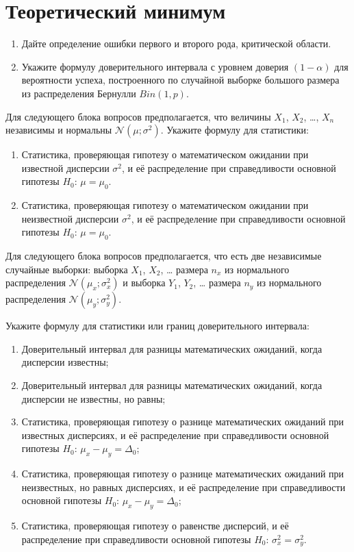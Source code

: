 \documentclass[12pt]{article}
\def \cN{\mathcal{N}}
\begin{document}
\section{Теоретический минимум}


\begin{enumerate}
  \item Дайте определение ошибки первого и второго рода, критической области.
  \item Укажите формулу доверительного интервала с уровнем доверия $(1-\alpha)$ для вероятности успеха, построенного по случайной выборке большого размера из распределения Бернулли $Bin(1, p)$.  
\end{enumerate}

Для следующего блока вопросов предполагается, что величины $X_1$, $X_2$, \ldots, $X_n$ независимы и нормальны $\cN(\mu;\sigma^2)$.
Укажите формулу для статистики: 

\begin{enumerate}[resume]
  \item Статистика, проверяющая гипотезу о математическом ожидании при известной дисперсии $\sigma^2$, 
    и её распределение при справедливости основной гипотезы  $H_0$: $\mu = \mu_0$. 
  \item Статистика, проверяющая гипотезу о математическом ожидании при неизвестной дисперсии $\sigma^2$, 
    и её распределение при справедливости основной гипотезы  $H_0$: $\mu = \mu_0$. 
\end{enumerate}


Для следующего блока вопросов предполагается, что есть две независимые случайные выборки: 
выборка $X_1$, $X_2$, \ldots{ }размера $n_x$ из нормального распределения $\cN(\mu_x;\sigma^2_x)$ 
и выборка $Y_1$, $Y_2$, \ldots{ }размера $n_y$ из нормального распределения $\cN(\mu_y;\sigma^2_y)$. 

Укажите формулу для статистики или границ доверительного интервала:

\begin{enumerate}[resume]
  \item Доверительный интервал для разницы математических ожиданий, когда дисперсии известны;
  \item Доверительный интервал для разницы математических ожиданий, когда дисперсии не известны, но равны;
  \item Статистика, проверяющая гипотезу о разнице математических ожиданий при известных дисперсиях, 
    и её распределение при справедливости основной гипотезы $H_0$: $\mu_x - \mu_y = \Delta_0$;
  \item Статистика, проверяющая гипотезу о разнице математических ожиданий при неизвестных, но равных дисперсиях, 
    и её распределение при справедливости основной гипотезы $H_0$: $\mu_x - \mu_y = \Delta_0$;
  \item Статистика, проверяющая гипотезу о равенстве дисперсий, 
    и её распределение при справедливости основной гипотезы $H_0$: $\sigma^2_x = \sigma^2_y$.
\end{enumerate}
\end{document}
